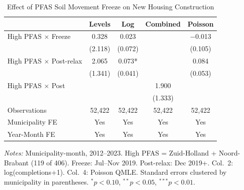 \begin{table}[htbp]
\centering
\caption{Effect of PFAS Soil Movement Freeze on New Housing Construction}
\label{tab:main}
\begin{threeparttable}
\begin{tabular}{lcccc}
\hline\hline
 & Levels & Log & Combined & Poisson \\
\hline
High PFAS $\times$ Freeze & 0.328 & 0.023 &  & $-$0.013 \\
 & (2.118) & (0.072) &  & (0.105) \\
High PFAS $\times$ Post-relax & 2.065 & 0.073* &  & 0.084 \\
 & (1.341) & (0.041) &  & (0.053) \\
High PFAS $\times$ Post &  &  & 1.900 &  \\
 &  &  & (1.333) &  \\
\hline
Observations & 52,422 & 52,422 & 52,422 & 52,422 \\
Municipality FE & Yes & Yes & Yes & Yes \\
Year-Month FE & Yes & Yes & Yes & Yes \\
\hline\hline
\end{tabular}
\begin{tablenotes}[flushleft]
\small
\item \textit{Notes:} Municipality-month, 2012--2023. High PFAS = Zuid-Holland + Noord-Brabant (119 of 406). Freeze: Jul--Nov 2019. Post-relax: Dec 2019+. Col.~2: log(completions+1). Col.~4: Poisson QMLE. Standard errors clustered by municipality in parentheses. $^{*}p < 0.10$, $^{**}p < 0.05$, $^{***}p < 0.01$.
\end{tablenotes}
\end{threeparttable}
\end{table}
